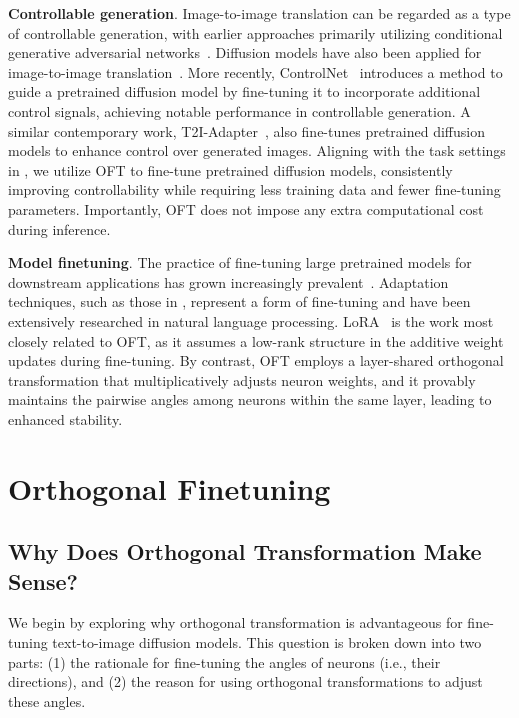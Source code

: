 \textbf{Controllable generation}. Image-to-image translation can be regarded as a type of controllable generation, with earlier approaches primarily utilizing conditional generative adversarial networks~\cite{isola2017image,zhu2017toward,wang2018high,park2019semantic,choi2018stargan}. Diffusion models have also been applied for image-to-image translation~\cite{saharia2022palette,voynov2022sketch,wang2022pretraining}. More recently, ControlNet~\cite{zhang2023adding} introduces a method to guide a pretrained diffusion model by fine-tuning it to incorporate additional control signals, achieving notable performance in controllable generation. A similar contemporary work, T2I-Adapter~\cite{mou2023t2i}, also fine-tunes pretrained diffusion models to enhance control over generated images. Aligning with the task settings in \cite{zhang2023adding,mou2023t2i}, we utilize OFT to fine-tune pretrained diffusion models, consistently improving controllability while requiring less training data and fewer fine-tuning parameters. Importantly, OFT does not impose any extra computational cost during inference.

\textbf{Model finetuning}. The practice of fine-tuning large pretrained models for downstream applications has grown increasingly prevalent~\cite{devlin2018bert,brown2020language,he2022masked}. Adaptation techniques, such as those in \cite{hulora2022,houlsby2019parameter,pfeiffer2020adapterfusion}, represent a form of fine-tuning and have been extensively researched in natural language processing. LoRA~\cite{hulora2022} is the work most closely related to OFT, as it assumes a low-rank structure in the additive weight updates during fine-tuning. By contrast, OFT employs a layer-shared orthogonal transformation that multiplicatively adjusts neuron weights, and it provably maintains the pairwise angles among neurons within the same layer, leading to enhanced stability.

\section{Orthogonal Finetuning}

\subsection{Why Does Orthogonal Transformation Make Sense?}

We begin by exploring why orthogonal transformation is advantageous for fine-tuning text-to-image diffusion models. This question is broken down into two parts: (1) the rationale for fine-tuning the angles of neurons (i.e., their directions), and (2) the reason for using orthogonal transformations to adjust these angles.

